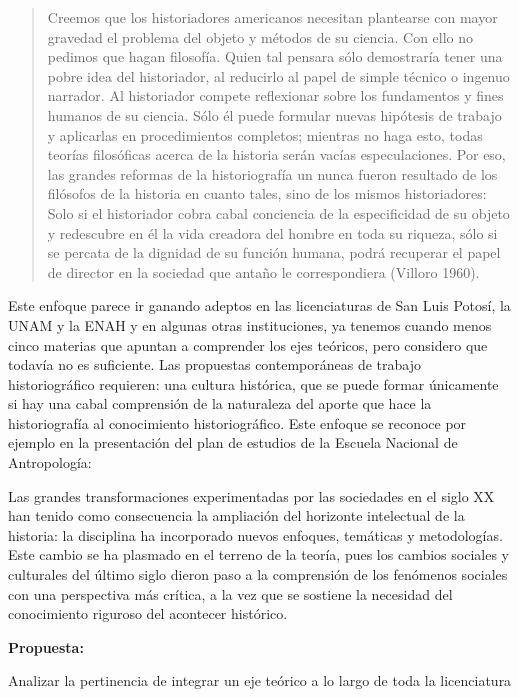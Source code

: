 \begin{quotation}
Creemos que los historiadores americanos necesitan plantearse con mayor 
gravedad el problema del  objeto y métodos de su ciencia. Con ello no 
pedimos que hagan filosofía. Quien tal pensara sólo demostraría tener 
una pobre idea del historiador, al reducirlo al papel de simple técnico 
o ingenuo narrador. Al historiador compete reflexionar sobre los 
fundamentos y fines humanos de su ciencia. Sólo él puede formular 
nuevas hipótesis de trabajo y aplicarlas en procedimientos completos; 
mientras no haga esto, todas teorías filosóficas acerca de la historia 
serán vacías especulaciones. Por eso, las grandes reformas de la 
historiografía un nunca fueron resultado de los filósofos de la 
historia en cuanto tales, sino de los mismos historiadores: Solo si el 
historiador cobra cabal conciencia de la especificidad de su objeto y 
redescubre en él la vida creadora del hombre en toda su riqueza, sólo 
si se percata de la dignidad de su función humana, podrá recuperar el 
papel de director en la sociedad que antaño le correspondiera (Villoro 1960). 
\end{quotation}

Este enfoque parece ir ganando adeptos en las licenciaturas de San Luis
Potosí, la UNAM y la ENAH y en algunas otras instituciones, ya tenemos
cuando menos cinco materias que apuntan a comprender los ejes teóricos, pero
considero que todavía no es suficiente. Las propuestas contemporáneas de
trabajo historiográfico requieren: una cultura histórica, que se puede
formar únicamente si hay una cabal comprensión de la naturaleza del aporte
que hace la historiografía al conocimiento historiográfico. Este enfoque se
reconoce por ejemplo en la presentación del plan de estudios de la Escuela
Nacional de Antropología: 

Las grandes transformaciones experimentadas por las sociedades en el siglo
XX han tenido como consecuencia la ampliación del horizonte intelectual de
la historia: la disciplina ha incorporado nuevos enfoques, temáticas y
metodologías. Este cambio se ha plasmado en el terreno de la teoría, pues
los cambios sociales y culturales del último siglo dieron paso a la
comprensión de los fenómenos sociales con una perspectiva más crítica, a la
vez que se sostiene la necesidad del conocimiento riguroso del acontecer
histórico.

\medskip
\textbf{\bfseries Propuesta:}

\medskip
Analizar la pertinencia de integrar un eje teórico a lo largo de toda la
licenciatura

